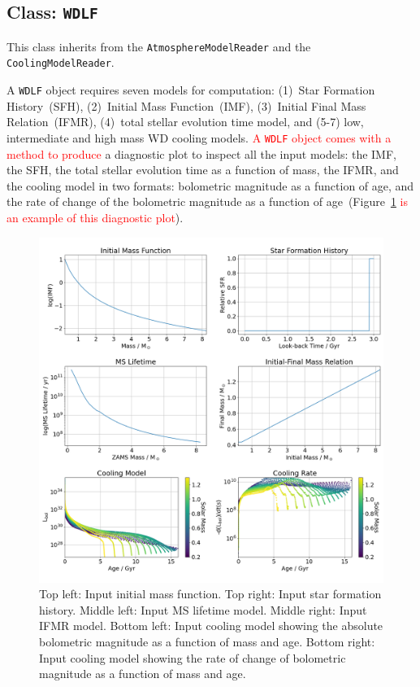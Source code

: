 \documentclass[fleqn,usenatbib]{rasti}
\begin{document}
\subsection{Class: \texttt{WDLF}}
\label{sec:wdlf}
This class inherits from the \verb+AtmosphereModelReader+ and the
\verb+CoolingModelReader+.

A \texttt{WDLF} object requires seven models for computation: (1)~Star
Formation History~(SFH), (2)~Initial Mass Function~(IMF), (3)~Initial Final
Mass Relation~(IFMR), (4)~total stellar evolution time model, and (5-7) low,
intermediate and high mass WD cooling models.
\textcolor{red}{A \texttt{WDLF} object comes with a method to produce}
a diagnostic plot to inspect all the input models: the IMF, the SFH, the total
stellar evolution time as a function of mass, the IFMR, and the cooling model
in two formats: bolometric magnitude as a function of age, and the rate of
change of the bolometric magnitude as a function of
age~(Figure~\ref{fig:input_model} \textcolor{red}{is an example of this diagnostic plot}).

\begin{figure}
    \centering
    \includegraphics[width=\textwidth]{fig_07_input_model.png}
    \caption{Top left: Input initial mass function. Top right: Input star
    formation history. Middle left: Input MS lifetime model. Middle right:
    Input IFMR model. Bottom left: Input cooling model showing the absolute
    bolometric magnitude as a function of mass and age. Bottom right: Input
    cooling model showing the rate of change of bolometric magnitude as a
    function of mass and age.}
    \label{fig:input_model}
\end{figure}
\end{document}
